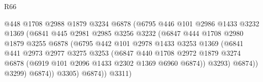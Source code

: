 \begin{lexlean}{R66}
\begin{coremodule}
                                    @448
                                    @1708
                                    @2988
                                    @1879
                                    @3234
                                    @6878
                                    (@6795
                                      @446
                                      @101
                                      @2986
                                      @1433
                                      @3232
                                      @1369
                                      (@6841
                                        @445
                                        @2981
                                        @2985
                                        @3256
                                        @3232
                                        (@6847
                                          @444
                                          @1708
                                          @2980
                                          @1879
                                          @3255
                                          @6878
                                          (@6795
                                            @442
                                            @101
                                            @2978
                                            @1433
                                            @3253
                                            @1369
                                            (@6841
                                              @441
                                              @2973
                                              @2977
                                              @3275
                                              @3253
                                              (@6847
                                                @440
                                                @1708
                                                @2972
                                                @1879
                                                @3274
                                                @6878
                                                (@6919 @101 @2096 @1433 @2302 @1369 @6960 @6874))
                                              @3293)
                                            @6874))
                                        @3299)
                                      @6874))
                                  @3305)
                                @6874))
                            @3311)

\end{coremodule}
\end{lexlean}
